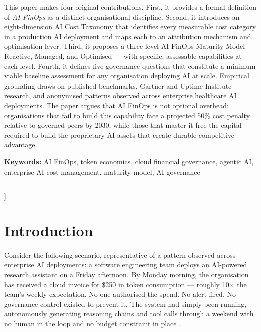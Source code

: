 \documentclass[11pt,twocolumn]{article}
\begin{document}
{\begin{@twocolumnfalse}
\begin{onecolabstract}
This paper makes four original contributions. First, it provides a formal definition
of \textit{AI FinOps} as a distinct organisational discipline. Second, it introduces
an eight-dimension AI Cost Taxonomy that identifies every measurable cost category
in a production AI deployment and maps each to an attribution mechanism and
optimisation lever. Third, it proposes a three-level AI FinOps Maturity Model
--- Reactive, Managed, and Optimised --- with specific, assessable capabilities
at each level. Fourth, it defines five governance questions that constitute a
minimum viable baseline assessment for any organisation deploying AI at scale.
Empirical grounding draws on published benchmarks, Gartner and Uptime Institute
research, and anonymised patterns observed across enterprise healthcare AI deployments.
The paper argues that AI FinOps is not optional overhead: organisations that fail to
build this capability face a projected 50\% cost penalty relative to governed peers
by 2030, while those that master it free the capital required to build the proprietary
AI assets that create durable competitive advantage.

\smallskip
\noindent\textbf{Keywords:} AI FinOps, token economics, cloud financial governance,
agentic AI, enterprise AI cost management, maturity model, AI governance
\end{onecolabstract}

\vspace{10pt}
{\color{teal}\rule{\linewidth}{0.6pt}}
\vspace{12pt}

\end{@twocolumnfalse}
}]

\section{Introduction}
\label{sec:intro}

Consider the following scenario, representative of a pattern observed across
enterprise AI deployments: a software engineering team deploys an AI-powered
research assistant on a Friday afternoon. By Monday morning, the organisation
has received a cloud invoice for \$250 in token consumption --- roughly 10$\times$
the team's weekly expectation. No one authorised the spend. No alert fired. No
governance control existed to prevent it. The system had simply been running,
autonomously generating reasoning chains and tool calls through a weekend with
no human in the loop and no budget constraint in place \citep{anthropic2025}.
\end{document}
